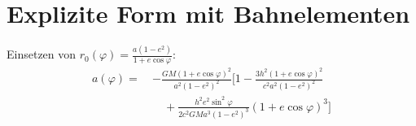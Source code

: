 \section{Explizite Form mit Bahnelementen}
Einsetzen von \( r_0(\varphi) = \frac{a(1-e^2)}{1 + e \cos\varphi} \):
\begin{align*}
a(\varphi) =\ & -\frac{GM(1 + e \cos\varphi)^2}{a^2(1-e^2)^2} \Bigg[ 
1 - \frac{3h^2(1 + e \cos\varphi)^2}{c^2 a^2(1-e^2)^2} \\
&\quad + \frac{h^2 e^2 \sin^2\varphi}{2c^2 GM a^3(1-e^2)^3} (1 + e \cos\varphi)^3 
\Bigg]
\end{align*}
